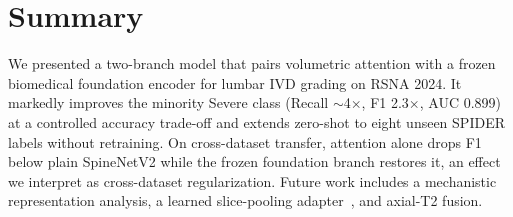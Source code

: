 \documentclass[runningheads]{llncs}
\begin{document}
\section{Summary}\label{sec5}

We presented a two-branch model that pairs volumetric attention with a frozen biomedical foundation encoder for lumbar IVD grading on RSNA 2024. It markedly improves the minority Severe class (Recall $\sim$4$\times$, F1 2.3$\times$, AUC 0.899) at a controlled accuracy trade-off and extends zero-shot to eight unseen SPIDER labels without retraining. On cross-dataset transfer, attention alone drops F1 below plain SpineNetV2 while the frozen foundation branch restores it, an effect we interpret as cross-dataset regularization. Future work includes a mechanistic representation analysis, a learned slice-pooling adapter~\cite{lu2024radclip}, and axial-T2 fusion.

%


\end{document}
